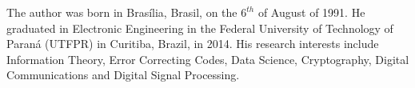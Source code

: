 \noindent The author was born in Bras\'{i}lia, Brasil, on the $6^{th}$ of August of 1991. He graduated in Electronic Engineering in the Federal University of Technology of Paran\'{a} (UTFPR) in Curitiba, Brazil, in 2014. His research interests include Information Theory, Error Correcting Codes, Data Science, Cryptography, Digital Communications and Digital Signal Processing.

